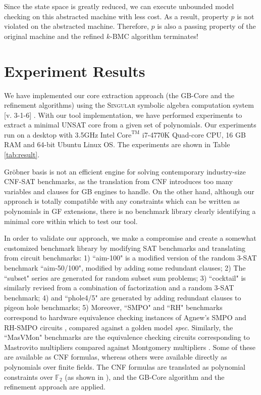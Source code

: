 \begin{Example}
Since the state space is greatly
reduced, we can execute unbounded model checking on this  abstracted
machine with less cost. As a result, property $p$ is not violated on
the abstracted machine. Therefore, $p$ is also a passing property of
the original machine and  the refined $k$-BMC algorithm terminates!


\end{Example}

\section{Experiment Results}
\label{sec:exp}


We have implemented our core extraction approach (the GB-Core
and the refinement algorithms) using the \textsc{Singular} symbolic
algebra computation system [v. 3-1-6] \cite{DGPS}. With our
tool implementation, we have performed experiments to extract a
minimal UNSAT core from a given set of  
polynomials. Our experiments run on a desktop with
3.5GHz Intel $\text{Core}^\text{TM}$ i7-4770K Quad-core CPU, 16 GB RAM and
64-bit Ubuntu Linux OS. The experiments are shown in Table \ref{tab:result}. 

Gr\"obner basis is not an efficient engine for solving contemporary
industry-size CNF-SAT benchmarks, as the translation from CNF introduces
too many variables and clauses for GB engines to handle. 
On the other hand, although our approach is totally compatible with 
any constraints which can be written as polynomials in GF extensions,
there is no benchmark library clearly identifying a minimal core within 
which to test our tool.

In order to
validate our approach, we make a compromise and create a somewhat customized  benchmark
library by modifying SAT benchmarks and translating from circuit benchmarks: 
1) ``aim-100" is a modified version  of the random 3-SAT
benchmark ``aim-50/100", modified by adding some redundant clauses; 2)
The ``subset" series are generated for random subset sum problems; 3)
``cocktail" is similarly revised from a combination of factorization
and a random 3-SAT benchmark; 4) and ``phole4/5" are generated by
adding redundant clauses to pigeon hole benchmarks; 5) Moreover,
``SMPO" and ``RH" benchmarks correspond to hardware equivalence checking
instances of Agnew's SMPO and RH-SMPO
circuits \cite{agnew1991implementation,RHmulti}, compared against a golden model
{\it spec}. Similarly, the ``MasVMon" benchmarks are the equivalence
checking  circuits corresponding to Mastrovito multipliers compared
against  Montgomery multipliers \cite{lv:tcad2013}. Some of these are
available as CNF formulas, whereas others were available directly as
polynomials over finite fields. The CNF formulas are translated as
polynomial constraints over $\mathbb{F}_2$ (as shown in
\cite{condrat-tacas07}), and the GB-Core algorithm and the refinement
approach are applied.   

